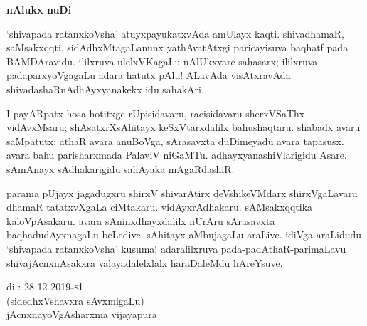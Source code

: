 \begin{center}
{\Huge\bfseries nAlukx nuDi}
\end{center}

\bigskip

`shivapada ratanxkoVsha' atuyxpayukatxvAda amUlayx kaqti. shivadhamaR, saMsakxqqti, sidAdhxMtagaLanunx yathAvatAtxgi paricayisuva baqhatf pada BAMDAravidu. ililxruva ulelxVKagaLu nAlUkxvare sahasarx; ililxruva padaparxyoVgagaLu adara hatutx pAlu! ALavAda visAtxravAda shivadashaRnAdhAyxyanakekx idu sahakAri.

\medskip

I payARpatx hosa hotitxge rUpisidavaru, racisidavaru sherxVSaThx vidAvxMsaru; shAsatxrXsAhitayx keSxVtarxdalilx bahushaqtaru. shabadx avaru saMpatutx; athaR avara anuBoVga, sArasavxta duDimeyadu avara tapasusx. avara bahu parisharxmada PalaviV niGaMTu. adhayxyana\-shiVlarigidu Asare. sAmAnayx sAdhakarigidu sahAyaka mAgaRdashiR.

\medskip

parama pUjayx jagadugxru shirxV shivarAtirx deVshikeVMdarx shirxVgaLavaru dhamaR tatatxvXgaLa ciMtakaru. vidAyxrAdhakaru. sAMsakxqqtika kaloVpAsakaru. avara sAninxdhayxdalilx nUrAru sArasavxta baqhadudAyxnagaLu beLedive. sAhitayx aMbujagaLu araLive. idiVga araLidudu `shivapada ratanxkoVsha' kusuma! adaralilxruva pada-padAthaR-parimaLavu shivajAcnxnAsakxra valayadalelxlalx haraDaleMdu hAreYsuve.

\vskip 1.5cm

\noindent
di : 28-12-2019\hfill {\bf -si}\hspace{1.7cm}\,\\
\phantom{aa}\hfill (sidedhxVshavxra sAvxmigaLu)\quad\,\\
\phantom{a} \hfill jAcnxnayoVgAsharxma vijayapura
